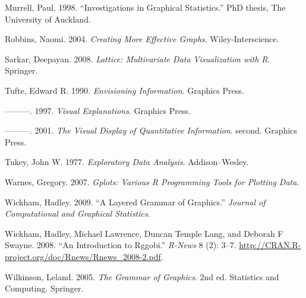 Murrell, Paul. 1998. ``Investigations in Graphical Statistics.''
PhD thesis, The University of Auckland.

Robbins, Naomi. 2004. \emph{Creating More Effective Graphs}.
Wiley-Interscience.

Sarkar, Deepayan. 2008. \emph{Lattice: Multivariate Data Visualization
with R}. Springer.

Tufte, Edward R. 1990. \emph{Envisioning Information}. Graphics Press.

---------. 1997. \emph{Visual Explanations}. Graphics Press.

---------. 2001. \emph{The Visual Display of Quantitative Information}.
second. Graphics Press.

Tukey, John W. 1977. \emph{Exploratory Data Analysis}. Addison--Wesley.

Warnes, Gregory. 2007. \emph{Gplots: Various R Programming Tools for
Plotting Data}.

Wickham, Hadley. 2009. ``A Layered Grammar of Graphics.'' \emph{Journal
of Computational and Graphical Statistics}.

Wickham, Hadley, Michael Lawrence, Duncan Temple Lang, and Deborah F
Swayne. 2008. ``An Introduction to Rggobi.'' \emph{R-News} 8 (2): 3--7.
\url{http://CRAN.R-project.org/doc/Rnews/Rnews_2008-2.pdf}.

Wilkinson, Leland. 2005. \emph{The Grammar of Graphics}. 2nd ed.
Statistics and Computing. Springer.
